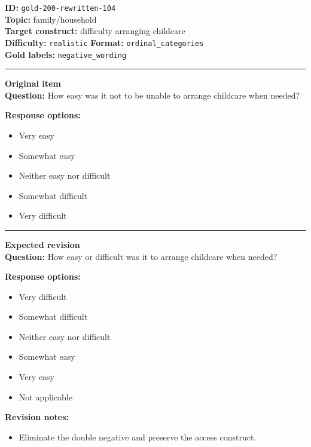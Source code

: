 \documentclass[10pt,a4paper]{article}
\newcommand{\sectionline}{\vspace{0.15em}\hrule\vspace{0.35em}}
\begin{document}
\begin{tcolorbox}[colframe=FlawRed,colback=white,colbacktitle=FlawRed!9,coltitle=black,title={Item 104\hfill Flawed item}]
\textbf{ID:} \texttt{gold-200-rewritten-104}\\
\textbf{Topic:} family/household\\
\textbf{Target construct:} difficulty arranging childcare\\
\textbf{Difficulty:} \texttt{realistic} \quad \textbf{Format:} \texttt{ordinal\_categories}\\
\textbf{Gold labels:} \texttt{negative\_wording}\\
\sectionline
\textbf{Original item}\\
\textbf{Question:} How easy was it not to be unable to arrange childcare when needed?
\par\textbf{Response options:}
\begin{itemize}
\item Very easy
\item Somewhat easy
\item Neither easy nor difficult
\item Somewhat difficult
\item Very difficult
\end{itemize}
\sectionline
\textbf{Expected revision}\\
\textbf{Question:} How easy or difficult was it to arrange childcare when needed?
\par\textbf{Response options:}
\begin{itemize}
\item Very difficult
\item Somewhat difficult
\item Neither easy nor difficult
\item Somewhat easy
\item Very easy
\item Not applicable
\end{itemize}
\par\textbf{Revision notes:}
\begin{itemize}
\item Eliminate the double negative and preserve the access construct.
\end{itemize}
\end{tcolorbox}
\end{document}
